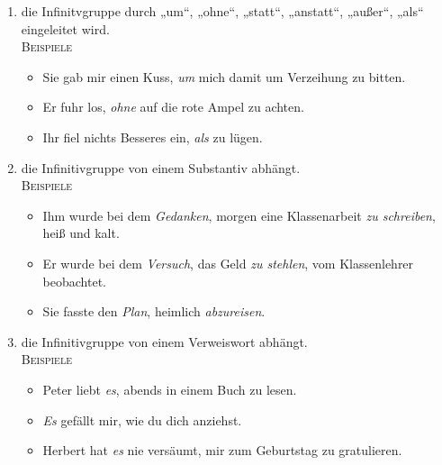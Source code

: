 \documentclass[landscape]{article}
\newcommand{\tbreak}{\\\vspace{-3mm}}
\newcommand*\glqq{„}
\newcommand*\grqq{“}
\newcommand{\gqm}[1]{\glqq #1\grqq}
\begin{document}
\begin{multicols*}{3}
    \begin{enumerate}[label=(\alph*)]
        \item die Infinitvgruppe durch \gqm{um}, \gqm{ohne}, \gqm{statt}, \gqm{anstatt}, \gqm{außer}, \gqm{als} eingeleitet wird.\\
            \textsc{Beispiele}\\

            \begin{itemize}
                \item Sie gab mir einen Kuss, \textit{um} mich damit um Verzeihung zu bitten.
                \item Er fuhr los, \textit{ohne} auf die rote Ampel zu achten.
                \item Ihr fiel nichts Besseres ein, \textit{als} zu lügen.
            \end{itemize}\quad\vspace{-4mm}

        \item die Infinitivgruppe von einem Substantiv abhängt.\\
            \textsc{Beispiele}\\

            \begin{itemize}
                \item Ihm wurde bei dem \textit{Gedanken}, morgen eine Klassenarbeit \textit{zu schreiben}, heiß und kalt.
                \item Er wurde bei dem \textit{Versuch}, das Geld \textit{zu stehlen}, vom Klassenlehrer beobachtet.
                \item Sie fasste den \textit{Plan}, heimlich \textit{abzureisen}.
            \end{itemize}\quad\vspace{-4mm}

        \item die Infinitivgruppe von einem Verweiswort abhängt.\\
            \textsc{Beispiele}\\

            \begin{itemize}
                \item Peter liebt \textit{es}, abends in einem Buch zu lesen.
                \item \textit{Es} gefällt mir, wie du dich anziehst.
                \item Herbert hat \textit{es} nie versäumt, mir zum Geburtstag zu gratulieren.
            \end{itemize}
    \end{enumerate}\quad\tbreak


\end{multicols*}
\end{document}
